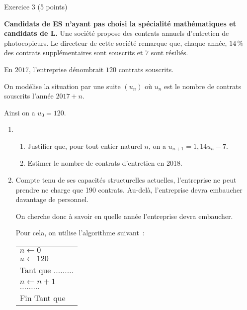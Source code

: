 
\begin{h2}Exercice 3 (5 points)\end{h2}
\textbf{Candidats de ES n'ayant pas choisi la spécialité \og mathématiques \fg{} et candidats de L.}
\medskip
Une société propose des contrats annuels d'entretien de photocopieurs. Le directeur de cette société remarque que, chaque année, $14\,\%$ des contrats supplémentaires sont souscrits et $7$ sont résiliés.
\par
En $2017$, l'entreprise dénombrait $120$ contrats souscrits.
\par
On modélise la situation par une suite $(u_n)$ où $u_n$ est le nombre de contrats souscrits l'année $2017+n$.
\par
Ainsi on a $u_0=120$.
\begin{enumerate}
     \item
     \begin{enumerate}[label=\alph*.]
          \item Justifier que, pour tout entier naturel $n$, on a $u_{n+1}=1,14 u_n-7$.
          \item Estimer le nombre de contrats d'entretien en 2018.
     \end{enumerate}
     \item Compte tenu de ses capacités structurelles actuelles, l'entreprise ne peut prendre ne charge que 190 contrats. Au-delà, l'entreprise devra embaucher davantage de personnel.
     \par
     On cherche donc à savoir en quelle année l'entreprise devra embaucher.
     \par
     Pour cela, on utilise l'algorithme suivant~:
     \begin{center}
          \begin{extern}%
               \renewcommand{\arraystretch}{1.25}
               \begin{tabularx}{0.3\linewidth}{|X|}
                    \hline
                    $n\longleftarrow 0$\\
                    $u\longleftarrow 120$\\
                    Tant que $\ldots\ldots\ldots$\\
                    \hspace*{1cm} $n\longleftarrow n+1$\\
                    \hspace*{1cm} $\ldots\ldots\ldots$\\
                    Fin Tant que\\

\end{tabularx}
\end{extern}
\end{center}
\end{enumerate}
